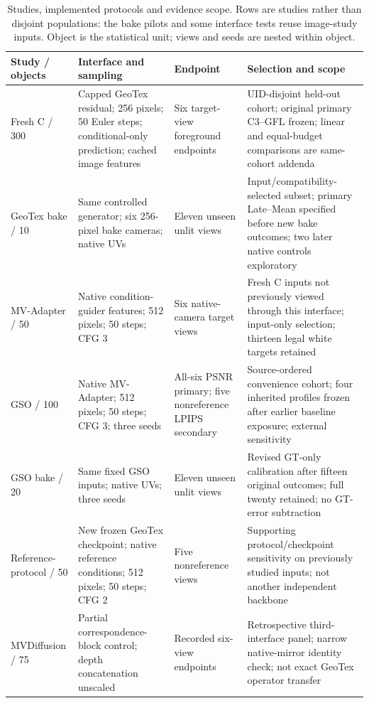 \documentclass[times,twocolumn,final]{elsarticle}
\begin{document}
\begin{table}[t]
\centering\scriptsize\setlength{\tabcolsep}{3pt}
\caption{Studies, implemented protocols and evidence scope. Rows are studies rather than disjoint populations: the bake pilots and some interface tests reuse image-study inputs. Object is the statistical unit; views and seeds are nested within object.}
\label{tab:study-design}
\begin{tabular}{p{}p{}p{}p{}}
\toprule Study / objects & Interface and sampling & Endpoint & Selection and scope \\
\midrule
Fresh C / 300 & Capped GeoTex residual; 256 pixels; 50 Euler steps; conditional-only prediction; cached image features & Six target-view foreground endpoints & UID-disjoint held-out cohort; original primary C3--GFL frozen; linear and equal-budget comparisons are same-cohort addenda \\
GeoTex bake / 10 & Same controlled generator; six 256-pixel bake cameras; native UVs & Eleven unseen unlit views & Input/compatibility-selected subset; primary Late--Mean specified before new bake outcomes; two later native controls exploratory \\
MV-Adapter / 50 & Native condition-guider features; 512 pixels; 50 steps; CFG 3 & Six native-camera target views & Fresh C inputs not previously viewed through this interface; input-only selection; thirteen legal white targets retained \\
GSO / 100 & Native MV-Adapter; 512 pixels; 50 steps; CFG 3; three seeds & All-six PSNR primary; five nonreference LPIPS secondary & Source-ordered convenience cohort; four inherited profiles frozen after earlier baseline exposure; external sensitivity \\
GSO bake / 20 & Same fixed GSO inputs; native UVs; three seeds & Eleven unseen unlit views & Revised GT-only calibration after fifteen original outcomes; full twenty retained; no GT-error subtraction \\
Reference-protocol / 50 & New frozen GeoTex checkpoint; native reference conditions; 512 pixels; 50 steps; CFG 2 & Five nonreference views & Supporting protocol/checkpoint sensitivity on previously studied inputs; not another independent backbone \\
MVDiffusion / 75 & Partial correspondence-block control; depth concatenation unscaled & Recorded six-view endpoints & Retrospective third-interface panel; narrow native-mirror identity check; not exact GeoTex operator transfer \\
\bottomrule
\end{tabular}
\end{table}
\end{document}
